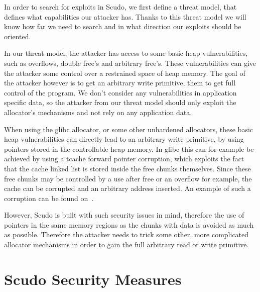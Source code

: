 \documentclass[a4paper,11pt,oneside]{report}
\begin{document}
In order to search for exploits in Scudo, we first define a threat model, that defines
what capabilities our attacker has. Thanks to this threat model we will
know how far we need to search and in what direction our exploits should be oriented.

In our threat model, the attacker has access to some basic heap vulnerabilities, such
as overflows, double free's and arbitrary free's. 
These vulnerabilities can give the
attacker some control over a restrained space of heap memory. The goal of the attacker
however is to get an arbitrary write primitive, them to get full control of the 
program. We don't consider any vulnerabilities in application specific data, so the
attacker from our threat model should only exploit the allocator's mechanisms and not rely
on any application data. 

When using the glibc allocator, or some other unhardened allocators, these basic heap
vulnerabilities can directly lead to an arbitrary write primitive, by using pointers
stored in the controllable heap memory. In glibc this can for example be achieved by using
a tcache forward pointer corruption, which exploits the fact that the cache linked list is
stored inside the free chunks themselves. Since these free chunks may be controlled by a
use after free or an overflow for example, the cache can be corrupted and an arbitrary
address inserted. An example of such a corruption can be found on~\cite{tcachePoisoning}.

However, Scudo is built with such security issues in mind, therefore the use of pointers in
the same memory regions as the chunks with data is avoided as much as possible. Therefore
the attacker needs to trick some other, more complicated allocator mechanisms in order to
gain the full arbitrary read or write primitive.

\chapter{Scudo Security Measures}

\end{document}
